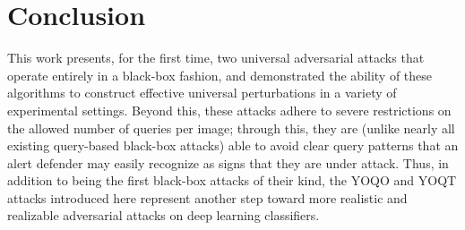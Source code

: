 \documentclass[letterpaper]{article}
\begin{document}
	
	\section{Conclusion}
	This work presents, for the first time, two universal adversarial attacks that operate entirely in a black-box fashion, and demonstrated the ability of these algorithms to construct effective universal perturbations in a variety of experimental settings. Beyond this, these attacks adhere to severe restrictions on the allowed number of queries per image; through this, they are (unlike nearly all existing query-based black-box attacks) able to avoid clear query patterns that an alert defender may easily recognize as signs that they are under attack. Thus, in addition to being the first black-box attacks of their kind, the YOQO and YOQT attacks introduced here represent another step toward more realistic and realizable adversarial attacks on deep learning classifiers.
	
	
	
	
	
\end{document}
